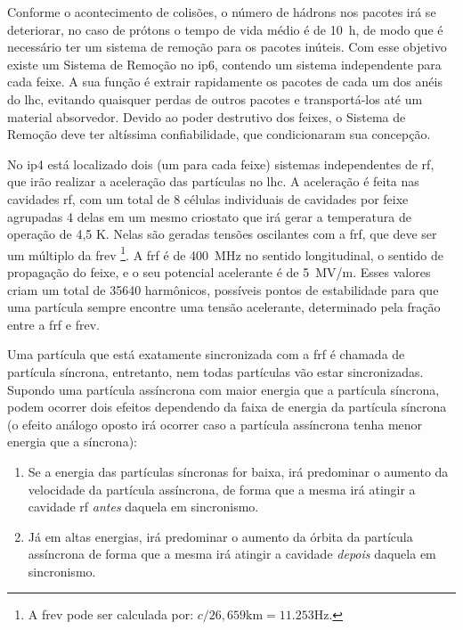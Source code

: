 Conforme o acontecimento de colisões, o número de hádrons nos pacotes irá se
deteriorar, no caso de prótons o tempo de vida médio é de 10~h, de modo que é necessário ter um 
sistema de remoção para os pacotes inúteis. Com esse objetivo existe um Sistema de Remoção no
\gls{ip}6, contendo um sistema independente para cada feixe. 
A sua função é extrair rapidamente os pacotes de cada um dos anéis do \gls{lhc}, evitando quaisquer
perdas de outros pacotes e transportá-los até um material
absorvedor. Devido ao poder destrutivo dos feixes, o Sistema de Remoção deve ter
altíssima confiabilidade, que condicionaram sua concepção.

No \gls{ip}4 está localizado dois (um para cada feixe) sistemas independentes de \gls{rf}, 
que irão realizar a aceleração das partículas no \gls{lhc}. A
aceleração é feita nas cavidades \gls{rf}, com um total de 8 células individuais 
de cavidades por feixe agrupadas 4 delas em um mesmo criostato 
que irá gerar a temperatura de operação de 4,5 K. Nelas são geradas tensões oscilantes
com a \gls{frf}, que deve ser um múltiplo da \gls{frev}
\footnote{A \gls{frev} pode ser calculada por: $c/26,659\text{km}=11.253
\text{Hz}$.}.  A \gls{frf} é de 400~MHz no sentido longitudinal, 
o sentido de propagação do feixe, e o seu potencial acelerante é de 5~MV/m.
Esses valores criam um total de 35640
harmônicos, possíveis pontos de estabilidade para que uma partícula 
sempre encontre uma tensão acelerante, determinado
pela fração entre a \gls{frf} e \gls{frev}. 

Uma partícula que está exatamente
sincronizada com a \gls{frf} é chamada de partícula síncrona, entretanto,
nem todas partículas vão estar sincronizadas. Supondo uma partícula assíncrona com maior
energia que a partícula síncrona, podem ocorrer dois efeitos dependendo da faixa
de energia da partícula síncrona (o efeito análogo oposto irá 
ocorrer caso a partícula assíncrona tenha menor energia que a síncrona):

\begin{enumerate}
\item Se a energia das partículas síncronas for baixa, irá predominar 
o aumento da velocidade da partícula assíncrona, de forma que a mesma irá
atingir a cavidade \gls{rf} \textit{antes} daquela em sincronismo.
\item Já em altas energias, irá predominar o aumento da órbita da partícula
assíncrona de forma que a mesma irá atingir a cavidade \textit{depois}
daquela em sincronismo.
\end{enumerate}

